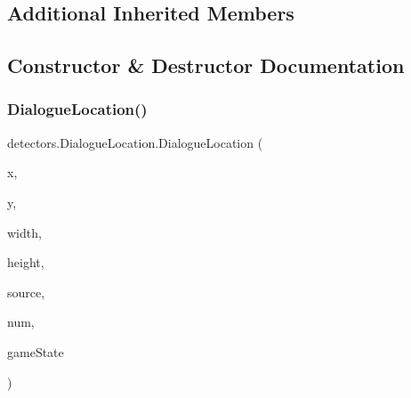\subsection*{Additional Inherited Members}


\subsection{Constructor \& Destructor Documentation}
\mbox{\label{classdetectors_1_1_dialogue_location_a2f71654b276247d2f8eed68e105c3409}} 
\subsubsection{\texorpdfstring{Dialogue\+Location()}{DialogueLocation()}\hspace{0.1cm}{\footnotesize\ttfamily [1/2]}}
{\footnotesize\ttfamily detectors.\+Dialogue\+Location.\+Dialogue\+Location (\begin{DoxyParamCaption}\item[{int}]{x,  }\item[{int}]{y,  }\item[{int}]{width,  }\item[{int}]{height,  }\item[{String}]{source,  }\item[{int}]{num,  }\item[{\mbox{\hyperlink{classstates_1_1_game_state}{Game\+State}}}]{game\+State }\end{DoxyParamCaption})\hspace{0.3cm}{\ttfamily [inline]}}


